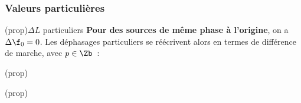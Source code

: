 \documentclass[../../main/main.tex]{subfiles}
\begin{document}
\subsubsection{Valeurs particulières}
\begin{tcb*}(prop){$\Delta{L}$ particuliers}
	\textbf{Pour des sources de même phase à l'origine}, on a $\Delta{\f_0} = 0$.
	Les déphasages particuliers se réécrivent alors en termes de différence de
	marche, avec $p \in \Zb$~:
	\smallbreak
	\begin{isd}[righthand ratio=.33, interior hidden, sidebyside align=top](prop)
		\begin{isd}[interior hidden, sidebyside align=top](prop)
			\psw{%
				\[
					\boxed{\Delta{L}_{2/1}(M) = p\lambda}
				\]
			}%
			\tcblower
			\vspace{-15pt}
			\psw{%
				\[
					\boxed{\Delta{L}_{2/1}(M) = \pa{p+\frac{1}{2}}\frac{\lambda}{2}}
				\]
			}%
		\end{isd}
		\tcblower
		\vspace{7pt}
		\vspace{-15pt}
		\psw{%
			\[
				\boxed{\Delta{L}_{2/1}(M) = \pa{2p+1}\frac{\lambda}{2}}
			\]
		}%
		\vspace{-15pt}
	\end{isd}
\end{tcb*}
\end{document}
